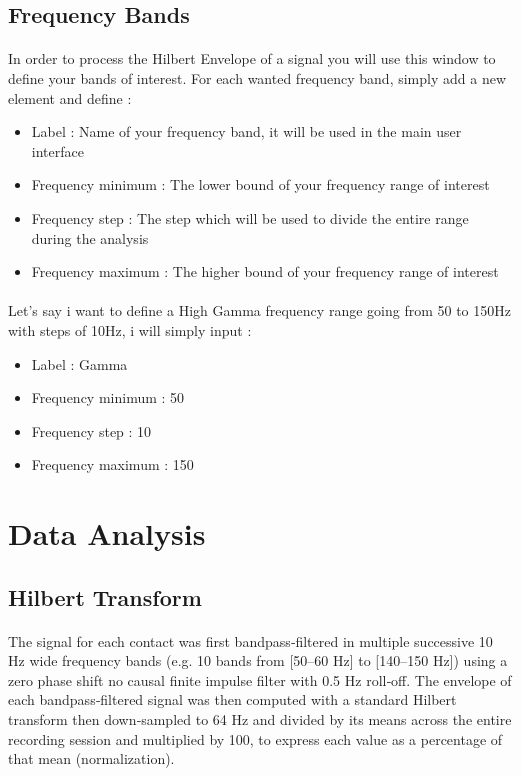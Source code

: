 \documentclass[a4paper]{article}
\begin{document}
\subsection{Frequency Bands}
\paragraph{} In order to process the Hilbert Envelope of a signal you will use this window to define your bands of interest. 
For each wanted frequency band, simply add a new element and define : 
\begin{itemize}
\item Label : Name of your frequency band, it will be used in the main user interface
\item Frequency minimum : The lower bound of your frequency range of interest
\item Frequency step : The step which will be used to divide the entire range during the analysis
\item Frequency maximum : The higher bound of your frequency range of interest
\end{itemize}

\paragraph{} Let's say i want to define a High Gamma frequency range going from 50 to 150Hz with steps of 10Hz,  i will simply input :
\begin{itemize}
\item Label : Gamma
\item Frequency minimum : 50
\item Frequency step : 10
\item Frequency maximum : 150
\end{itemize}
\section{Data Analysis} \label{analysis}    
\subsection{Hilbert Transform}
\paragraph{} The signal for each contact was first bandpass‐filtered in multiple successive 10 Hz wide frequency bands (e.g. 10 bands from [50–60 Hz] to [140–150 Hz]) using a zero phase shift no causal finite impulse filter with 0.5 Hz roll‐off. The envelope of each bandpass‐filtered signal was then computed with a standard Hilbert transform then down‐sampled to 64 Hz and divided by its means across the entire recording session and multiplied by 100, to express each value as a percentage of that mean (normalization).  
\end{document}
